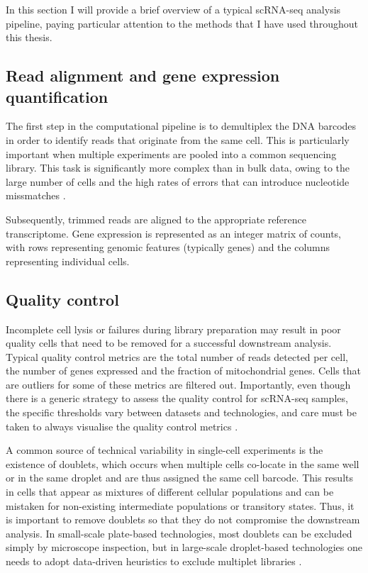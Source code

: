 In this section I will provide a brief overview of a typical scRNA-seq analysis pipeline, paying particular attention to the methods that I have used throughout this thesis.

\subsection{Read alignment and gene expression quantification}

The first step in the computational pipeline is to demultiplex the DNA barcodes in order to identify reads that originate from the same cell. This is particularly important when multiple experiments are pooled into a common sequencing library. This task is significantly more complex than in bulk data, owing to the large number of cells and the high rates of errors that can introduce nucleotide missmatches \cite{Tambe2019}.

Subsequently, trimmed reads are aligned to the appropriate reference transcriptome. Gene expression is represented as an integer matrix of counts, with rows representing genomic features (typically genes) and the columns representing individual cells. 

\subsection{Quality control}

Incomplete cell lysis or failures during library preparation may result in poor quality cells that need to be removed for a successful downstream analysis. Typical quality control metrics are the total number of reads detected per cell, the number of genes expressed and the fraction of mitochondrial genes. Cells that are outliers for some of these metrics are filtered out. Importantly, even though there is a generic strategy to assess the quality control for scRNA-seq samples, the specific thresholds vary between datasets and technologies, and care must be taken to always visualise the quality control metrics \cite{Luecken2019}.

A common source of technical variability in single-cell experiments is the existence of doublets, which occurs when multiple cells co-locate in the same well or in the same droplet and are thus assigned the same cell barcode. This results in cells that appear as mixtures of different cellular populations and can be mistaken for non-existing intermediate populations or transitory states.  Thus, it is important to remove doublets so that they do not compromise the downstream analysis. In small-scale plate-based technologies, most doublets can be excluded simply by microscope inspection, but in large-scale droplet-based technologies one needs to adopt data-driven heuristics to exclude multiplet libraries \cite{McGinnis2019}. 


